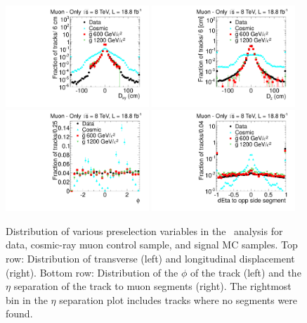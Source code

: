 \begin{figure}
\centering
  \includegraphics[clip=false, trim=0.0cm 0cm 0.0cm 0cm, width=0.48\textwidth]{figures/muonly/Selection_Comp_8TeV_Cosmic_Dxy_BS}
  \includegraphics[clip=false, trim=0.0cm 0cm 0.0cm 0cm, width=0.48\textwidth]{figures/muonly/Selection_Comp_8TeV_Cosmic_Dz_BS} \\
  \includegraphics[clip=false, trim=0.0cm 0cm 0.0cm 0cm, width=0.48\textwidth]{figures/muonly/Selection_Comp_8TeV_Cosmic_Phi_BS}
  \includegraphics[clip=false, trim=0.0cm 0cm 0.0cm 0cm, width=0.48\textwidth]{figures/muonly/Selection_Comp_8TeV_Cosmic_SegMinEtaSep_BS}
  \caption[Distribution of transverse and longitudinal displacement, $\phi$, and $\eta$ separation to muon segments
in the \muononly\ analysis for data, cosmic-ray muon control sample, and signal MC samples.]
{Distribution of various preselection variables in the \muononly\ analysis for data, cosmic-ray muon control sample, and signal MC samples.
Top row: Distribution of transverse (left) and longitudinal displacement (right).
Bottom row: Distribution of the $\phi$ of the track (left) and the $\eta$ separation of the track to muon segments (right). The rightmost bin in the
$\eta$ separation plot includes tracks where no segments were found.}
    \label{fig:MuOnlyPreselC}
\end{figure}

